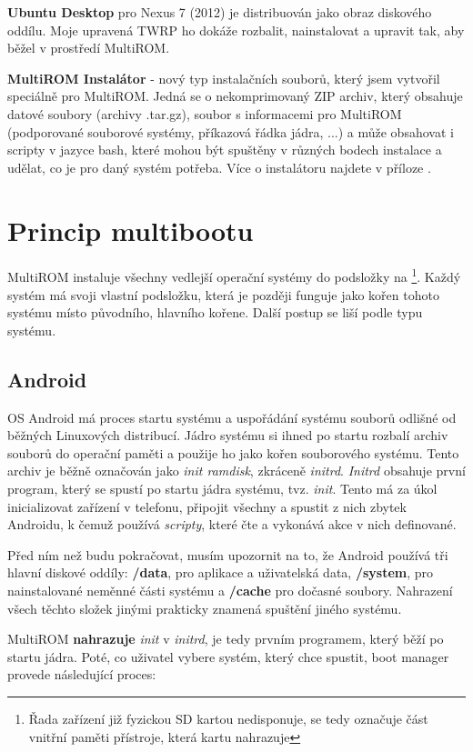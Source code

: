 \documentclass[12pt, a4paper, oneside]{article}
\newcommand{\B}{\textbf} %
\newcommand{\It}{\textit}  %
\begin{document}
\B{Ubuntu Desktop} pro Nexus 7 (2012) je distribuován jako obraz diskového oddílu. Moje upravená TWRP ho dokáže rozbalit, nainstalovat a upravit tak, aby běžel v prostředí MultiROM. 

\B{MultiROM Instalátor} - nový typ instalačních souborů, který jsem vytvořil speciálně pro MultiROM. Jedná se o nekomprimovaný ZIP archiv, který obsahuje datové soubory (archivy .tar.gz), soubor s informacemi pro MultiROM (podporované souborové systémy, příkazová řádka jádra, ...) a může obsahovat i scripty v jazyce bash, které mohou být spuštěny v různých bodech instalace a udělat, co je pro daný systém potřeba. Více o instalátoru najdete v příloze .

\section {Princip multibootu}
MultiROM instaluje všechny vedlejší operační systémy do podsložky na \footnote{Řada zařízení již fyzickou SD kartou nedisponuje,  se tedy označuje část vnitřní paměti přístroje, která kartu nahrazuje}. Každý systém má svoji vlastní podsložku, která je později funguje jako kořen tohoto systému místo původního, hlavního kořene. Další postup se liší podle typu systému.

\subsection{Android}
OS Android má proces startu systému a uspořádání systému souborů odlišné od běžných Linuxových distribucí. Jádro systému si ihned po startu rozbalí archiv souborů do operační paměti a použije ho jako kořen souborového systému. Tento archiv je běžně označován jako \It{init ramdisk}, zkráceně \It{initrd}. \It{Initrd} obsahuje první program, který se spustí po startu jádra systému, tvz. \It{init}. Tento má za úkol inicializovat zařízení v telefonu, připojit všechny  a spustit z nich zbytek Androidu, k čemuž používá \It{scripty}, které čte a vykonává akce v nich definované.

Před ním než budu pokračovat, musím upozornit na to, že Android používá tři hlavní diskové oddíly: \B{/data}, pro aplikace a uživatelská data, \B{/system}, pro nainstalované neměnné části systému a \B{/cache} pro dočasné soubory. Nahrazení všech těchto složek jinými prakticky znamená spuštění jiného systému.

MultiROM \B{nahrazuje} \It{init} v \It{initrd}, je tedy prvním programem, který běží po startu jádra. Poté, co uživatel vybere systém, který chce spustit, boot manager provede následující proces:
\end{document}

